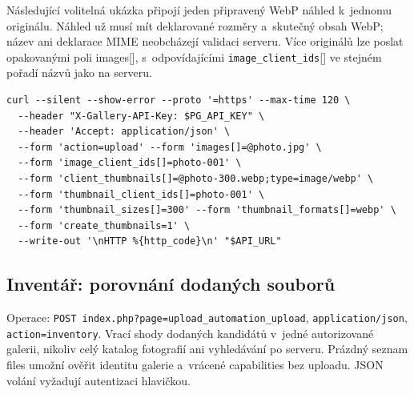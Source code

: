 \documentclass[11pt,a4paper]{article}
\newcommand{\codeword}[1]{\nolinkurl{#1}}
\begin{document}
Následující volitelná ukázka připojí jeden připravený WebP náhled k~jednomu originálu.
Náhled už musí mít deklarované rozměry a~skutečný obsah WebP; název ani deklarace MIME
neobcházejí validaci serveru. Více originálů lze poslat opakovanými poli images[],
s~odpovídajícími \codeword{image_client_ids}[] ve stejném pořadí názvů jako na serveru.

\begin{lstlisting}[language={}]
curl --silent --show-error --proto '=https' --max-time 120 \
  --header "X-Gallery-API-Key: $PG_API_KEY" \
  --header 'Accept: application/json' \
  --form 'action=upload' --form 'images[]=@photo.jpg' \
  --form 'image_client_ids[]=photo-001' \
  --form 'client_thumbnails[]=@photo-300.webp;type=image/webp' \
  --form 'thumbnail_client_ids[]=photo-001' \
  --form 'thumbnail_sizes[]=300' --form 'thumbnail_formats[]=webp' \
  --form 'create_thumbnails=1' \
  --write-out '\nHTTP %{http_code}\n' "$API_URL"
\end{lstlisting}

\subsection{\texorpdfstring{Inventář: porovnání dodaných souborů}{Inventář: porovnání dodaných souborů}}

\label{api352:inventory}

Operace: \codeword{POST index.php?page=upload_automation_upload},
\codeword{application/json}, \codeword{action=inventory}. Vrací shody dodaných kandidátů
v~jedné autorizované galerii, nikoliv celý katalog fotografií ani vyhledávání po serveru.
Prázdný seznam files umožní ověřit identitu galerie a~vrácené capabilities bez uploadu. JSON
volání vyžadují autentizaci hlavičkou.
\end{document}
